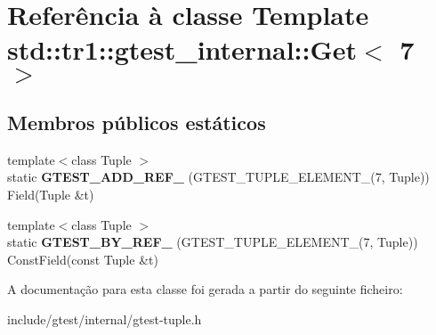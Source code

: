 \hypertarget{classstd_1_1tr1_1_1gtest__internal_1_1Get_3_017_01_4}{\section{Referência à classe Template std\-:\-:tr1\-:\-:gtest\-\_\-internal\-:\-:Get$<$ 7 $>$}
\label{classstd_1_1tr1_1_1gtest__internal_1_1Get_3_017_01_4}
}
\subsection*{Membros públicos estáticos}
\begin{DoxyCompactItemize}
\item 
\hypertarget{classstd_1_1tr1_1_1gtest__internal_1_1Get_3_017_01_4_ae1245f00b2ad610a130681b5bc81051c}{{\footnotesize template$<$class Tuple $>$ }\\static {\bfseries G\-T\-E\-S\-T\-\_\-\-A\-D\-D\-\_\-\-R\-E\-F\-\_\-} (G\-T\-E\-S\-T\-\_\-\-T\-U\-P\-L\-E\-\_\-\-E\-L\-E\-M\-E\-N\-T\-\_\-(7, Tuple)) Field(Tuple \&t)}\label{classstd_1_1tr1_1_1gtest__internal_1_1Get_3_017_01_4_ae1245f00b2ad610a130681b5bc81051c}

\item 
\hypertarget{classstd_1_1tr1_1_1gtest__internal_1_1Get_3_017_01_4_afb7bd56e0697304325cd157d11df4a7b}{{\footnotesize template$<$class Tuple $>$ }\\static {\bfseries G\-T\-E\-S\-T\-\_\-\-B\-Y\-\_\-\-R\-E\-F\-\_\-} (G\-T\-E\-S\-T\-\_\-\-T\-U\-P\-L\-E\-\_\-\-E\-L\-E\-M\-E\-N\-T\-\_\-(7, Tuple)) Const\-Field(const Tuple \&t)}\label{classstd_1_1tr1_1_1gtest__internal_1_1Get_3_017_01_4_afb7bd56e0697304325cd157d11df4a7b}

\end{DoxyCompactItemize}


A documentação para esta classe foi gerada a partir do seguinte ficheiro\-:\begin{DoxyCompactItemize}
\item 
include/gtest/internal/gtest-\/tuple.\-h\end{DoxyCompactItemize}
